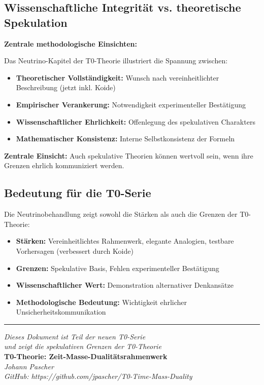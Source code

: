 	\subsection{Wissenschaftliche Integrität vs. theoretische Spekulation}
	
	\begin{keyresult}
		\textbf{Zentrale methodologische Einsichten:}
		
		Das Neutrino-Kapitel der T0-Theorie illustriert die Spannung zwischen:
		
		\begin{itemize}
			\item \textbf{Theoretischer Vollständigkeit:} Wunsch nach vereinheitlichter Beschreibung (jetzt inkl. Koide)
			\item \textbf{Empirischer Verankerung:} Notwendigkeit experimenteller Bestätigung
			\item \textbf{Wissenschaftlicher Ehrlichkeit:} Offenlegung des spekulativen Charakters
			\item \textbf{Mathematischer Konsistenz:} Interne Selbstkonsistenz der Formeln
		\end{itemize}
		
		\textbf{Zentrale Einsicht:} Auch spekulative Theorien können wertvoll sein, wenn ihre Grenzen ehrlich kommuniziert werden.
	\end{keyresult}
	
	\subsection{Bedeutung für die T0-Serie}
	
	Die Neutrinobehandlung zeigt sowohl die Stärken als auch die Grenzen der T0-Theorie:
	
	\begin{itemize}
		\item \textbf{Stärken:} Vereinheitlichtes Rahmenwerk, elegante Analogien, testbare Vorhersagen (verbessert durch Koide)
		\item \textbf{Grenzen:} Spekulative Basis, Fehlen experimenteller Bestätigung
		\item \textbf{Wissenschaftlicher Wert:} Demonstration alternativer Denkansätze
		\item \textbf{Methodologische Bedeutung:} Wichtigkeit ehrlicher Unsicherheitskommunikation
	\end{itemize}
	
	\begin{center}
		\hrule
		\vspace{0.5cm}
		\textit{Dieses Dokument ist Teil der neuen T0-Serie}\\
		\textit{und zeigt die spekulativen Grenzen der T0-Theorie}\\
		\vspace{0.3cm}
		\textbf{T0-Theorie: Zeit-Masse-Dualitätsrahmenwerk}\\
		\textit{Johann Pascher}\\
		
		\textit{GitHub: https://github.com/jpascher/T0-Time-Mass-Duality}
		\vspace{0.3cm}
	\end{center}
	
